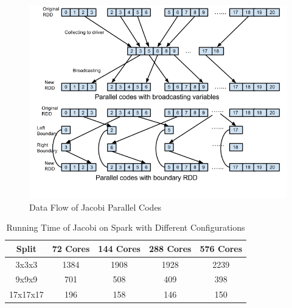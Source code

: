 \begin{figure}[H]
\centering
\includegraphics[scale=.6]{figures/JacobiCode.png}
\caption{Data Flow of Jacobi Parallel Codes}
\label{JacobiCode}
\end{figure}


\begin{table}[H]
\caption{Running Time of Jacobi on Spark with Different Configurations}
\centering
\begin{tabular}{||c| c c c c ||} 
 \hline
 Split & 72 Cores & 144 Cores & 288 Cores & 576 Cores \\ [0.5ex] 
 \hline
 3x3x3 & 1384 & 1908 & 1928 & 2239 \\ 
 9x9x9 & 701 & 508 & 409 & 398 \\
 17x17x17 & 196 & 158 & 146 & 150 \\
 \hline
\end{tabular}
\label{table:JacobiSpark}
\end{table}

